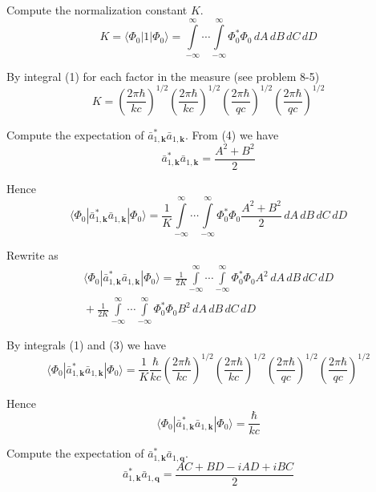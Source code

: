 \documentclass[12pt]{article}
\begin{document}
Compute the normalization constant $K$.
\begin{equation*}
K=\langle\Phi_0|1|\Phi_0\rangle
=\int\limits_{-\infty}^\infty\cdots\int\limits_{-\infty}^\infty
\Phi_0^*\Phi_0
\,dA\,dB\,dC\,dD
\end{equation*}

By integral (1) for each factor in the measure (see problem 8-5)
\begin{equation*}
K=
\left(\frac{2\pi\hbar}{kc}\right)^{1/2}
\left(\frac{2\pi\hbar}{kc}\right)^{1/2}
\left(\frac{2\pi\hbar}{qc}\right)^{1/2}
\left(\frac{2\pi\hbar}{qc}\right)^{1/2}
\end{equation*}

Compute the expectation of $\bar a_{1,\mathbf k}^*\bar a_{1,\mathbf k}$.
From (4) we have
\begin{equation*}
\bar a_{1,\mathbf k}^*\bar a_{1,\mathbf k}=\frac{A^2+B^2}{2}
\end{equation*}

Hence
\begin{equation*}
\langle\Phi_0|\bar a_{1,\mathbf k}^*\bar a_{1,\mathbf k}|\Phi_0\rangle
=\frac{1}{K}\int\limits_{-\infty}^\infty\cdots\int\limits_{-\infty}^\infty
\Phi_0^*\Phi_0
\frac{A^2+B^2}{2}
\,dA\,dB\,dC\,dD
\end{equation*}

Rewrite as
\begin{multline*}
\langle\Phi_0|\bar a_{1,\mathbf k}^*\bar a_{1,\mathbf k}|\Phi_0\rangle
=\frac{1}{2K}
\int\limits_{-\infty}^\infty\cdots\int\limits_{-\infty}^\infty
\Phi_0^*\Phi_0
A^2
\,dA\,dB\,dC\,dD
\\{}+
\frac{1}{2K}
\int\limits_{-\infty}^\infty\cdots\int\limits_{-\infty}^\infty
\Phi_0^*\Phi_0
B^2
\,dA\,dB\,dC\,dD
\end{multline*}

By integrals (1) and (3) we have
\begin{equation*}
\langle\Phi_0|\bar a_{1,\mathbf k}^*\bar a_{1,\mathbf k}|\Phi_0\rangle
=\frac{1}{K}\frac{\hbar}{kc}\left(\frac{2\pi\hbar}{kc}\right)^{1/2}
\left(\frac{2\pi\hbar}{kc}\right)^{1/2}
\left(\frac{2\pi\hbar}{qc}\right)^{1/2}
\left(\frac{2\pi\hbar}{qc}\right)^{1/2}
\end{equation*}

Hence
\begin{equation*}
\langle\Phi_0|\bar a_{1,\mathbf k}^*\bar a_{1,\mathbf k}|\Phi_0\rangle=\frac{\hbar}{kc}
\tag{5}
\end{equation*}

Compute the expectation of $\bar a_{1,\mathbf k}^*\bar a_{1,\mathbf q}$.
\begin{equation*}
\bar a_{1,\mathbf k}^*\bar a_{1,\mathbf q}
=\frac{AC+BD-iAD+iBC}{2}
\end{equation*}
\end{document}
